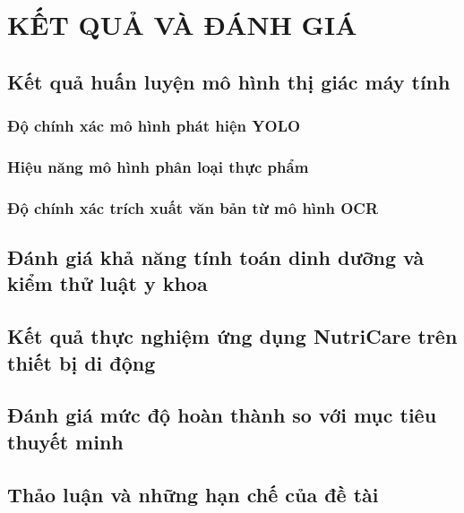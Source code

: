 \chapter{KẾT QUẢ VÀ ĐÁNH GIÁ}
\section{Kết quả huấn luyện mô hình thị giác máy tính}
\subsection{Độ chính xác mô hình phát hiện YOLO}
\subsection{Hiệu năng mô hình phân loại thực phẩm}
\subsection{Độ chính xác trích xuất văn bản từ mô hình OCR}
\section{Đánh giá khả năng tính toán dinh dưỡng và kiểm thử luật y khoa}
\section{Kết quả thực nghiệm ứng dụng NutriCare trên thiết bị di động}
\section{Đánh giá mức độ hoàn thành so với mục tiêu thuyết minh}
\section{Thảo luận và những hạn chế của đề tài}